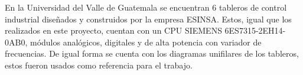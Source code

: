En la Universidad del Valle de Guatemala se encuentran 6 tableros de control industrial diseñados y construidos por la empresa ESINSA. Estos, igual que los realizados en este proyecto, cuentan con un CPU SIEMENS 6ES7315-2EH14-0AB0, módulos analógicos, digitales y de alta potencia con variador de frecuencias. De igual forma se cuenta con los diagramas unifilares de los tableros, estos fueron usados como referencia para el trabajo.

